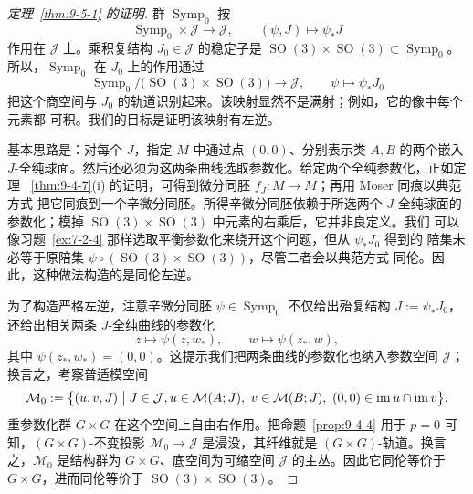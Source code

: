 \begin{proof}[定理~\ref{thm:9-5-1} 的证明]
群 $\operatorname{Symp}_0$ 按
\[
  \operatorname{Symp}_0\times\mathcal J\longrightarrow\mathcal J,
  \qquad(\psi,J)\longmapsto\psi_*J
\]
作用在 $\mathcal J$ 上。乘积复结构 $J_0\in\mathcal J$ 的稳定子是
$\operatorname{SO}(3)\times\operatorname{SO}(3)\subset\operatorname{Symp}_0$。
所以，$\operatorname{Symp}_0$ 在 $J_0$ 上的作用通过
\[
  \operatorname{Symp}_0/
  \bigl(\operatorname{SO}(3)\times\operatorname{SO}(3)\bigr)
  \longrightarrow\mathcal J,
  \qquad\psi\longmapsto\psi_*J_0
\]
把这个商空间与 $J_0$ 的轨道识别起来。该映射显然不是满射；例如，它的像中每个元素都
可积。我们的目标是证明该映射有左逆。

基本思路是：对每个 $J$，指定 $M$ 中通过点 $(0,0)$、分别表示类 $A,B$ 的两个嵌入
$J$-全纯球面。然后还必须为这两条曲线选取参数化。给定两个全纯参数化，正如定理
~\ref{thm:9-4-7}(i) 的证明，可得到微分同胚 $f_J:M\to M$；再用 Moser 同痕以典范方式
把它同痕到一个辛微分同胚。所得辛微分同胚依赖于所选两个 $J$-全纯球面的参数化；模掉
$\operatorname{SO}(3)\times\operatorname{SO}(3)$ 中元素的右乘后，它并非良定义。我们
可以像习题~\ref{ex:7-2-4} 那样选取平衡参数化来绕开这个问题，但从 $\psi_*J_0$ 得到的
陪集未必等于原陪集
$\psi\circ(\operatorname{SO}(3)\times\operatorname{SO}(3))$，尽管二者会以典范方式
同伦。因此，这种做法构造的是同伦左逆。

为了构造严格左逆，注意辛微分同胚 $\psi\in\operatorname{Symp}_0$ 不仅给出殆复结构
$J:=\psi_*J_0$，还给出相关两条 $J$-全纯曲线的参数化
\[
  z\longmapsto\psi(z,w_*),
  \qquad w\longmapsto\psi(z_*,w),
\]
其中 $\psi(z_*,w_*)=(0,0)$。这提示我们把两条曲线的参数化也纳入参数空间
$\mathcal J$；换言之，考察普适模空间
\[
  \mathcal M_0:=\bigl\{(u,v,J)\bigm|
  J\in\mathcal J, u\in\mathcal M(A;J),\ v\in\mathcal M(B;J),
  \ (0,0)\in\operatorname{im}u\cap\operatorname{im}v\bigr\}.
\]
重参数化群 $G\times G$ 在这个空间上自由右作用。把命题~\ref{prop:9-4-4} 用于 $p=0$
可知，$(G\times G)$-不变投影 $\mathcal M_0\to\mathcal J$ 是浸没，其纤维就是
$(G\times G)$-轨道。换言之，$\mathcal M_0$ 是结构群为 $G\times G$、底空间为可缩空间
$\mathcal J$ 的主丛。因此它同伦等价于 $G\times G$，进而同伦等价于
$\operatorname{SO}(3)\times\operatorname{SO}(3)$。


\end{proof}
